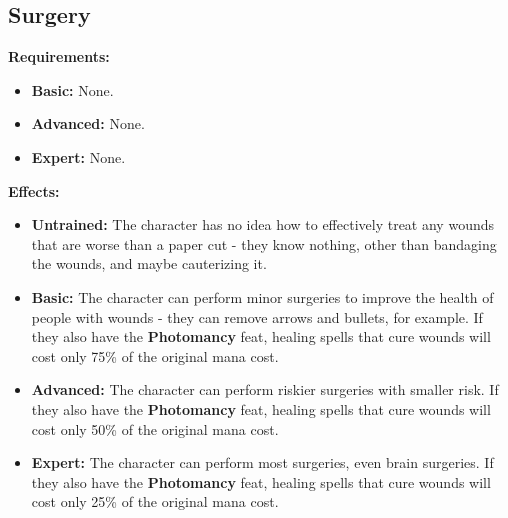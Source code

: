 \subsection{Surgery}
\begin{table}[!ht]
\centering
{}
\end{table}
\textbf{Requirements:}
\begin{itemize}
	\item \textbf{Basic:} None.
	\item \textbf{Advanced:} None.
	\item \textbf{Expert:} None.
\end{itemize}
\textbf{Effects:}
\begin{itemize}
	\item \textbf{Untrained:} The character has no idea how to effectively treat any wounds that are worse than a paper cut - they know nothing, other than bandaging the wounds, and maybe cauterizing it.
	\item \textbf{Basic:} The character can perform minor surgeries to improve the health of people with wounds - they can remove arrows and bullets, for example. If they also have the \textbf{Photomancy} feat, healing spells that cure wounds will cost only 75\% of the original mana cost.
	\item \textbf{Advanced:} The character can perform riskier surgeries with smaller risk. If they also have the \textbf{Photomancy} feat, healing spells that cure wounds will cost only 50\% of the original mana cost.
	\item \textbf{Expert:} The character can perform most surgeries, even brain surgeries. If they also have the \textbf{Photomancy} feat, healing spells that cure wounds will cost only 25\% of the original mana cost.
\end{itemize}\newpage
